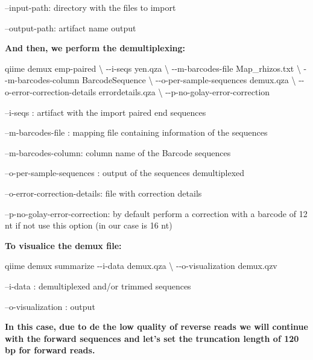 \documentclass[]{interact}
\theoremstyle{plain}%
\theoremstyle{definition}
\theoremstyle{remark}
\newenvironment{Shaded}{\begin{snugshade}}{\end{snugshade}}
\newcommand{\DataTypeTok}[1]{\textcolor[rgb]{0.13,0.29,0.53}{#1}}
\newcommand{\ExtensionTok}[1]{#1}
\newcommand{\NormalTok}[1]{#1}
\begin{document}
--input-path: directory with the files to import

--output-path: artifact name output

\textbf{And then, we perform the demultiplexing:}

\begin{Shaded}
\begin{Highlighting}[]
\ExtensionTok{qiime}\NormalTok{ demux emp{-}paired  }\DataTypeTok{\textbackslash{}}
\NormalTok{{-}{-}i{-}seqs yen.qza }\DataTypeTok{\textbackslash{}}
\NormalTok{{-}{-}m{-}barcodes{-}file Map\_rhizos.txt }\DataTypeTok{\textbackslash{}}
\NormalTok{{-}{-}m{-}barcodes{-}column BarcodeSequence }\DataTypeTok{\textbackslash{}}
\NormalTok{{-}{-}o{-}per{-}sample{-}sequences demux.qza }\DataTypeTok{\textbackslash{}}
\NormalTok{{-}{-}o{-}error{-}correction{-}details errordetails.qza }\DataTypeTok{\textbackslash{}}
\NormalTok{{-}{-}p{-}no{-}golay{-}error{-}correction }
\end{Highlighting}
\end{Shaded}

--i-seqs : artifact with the import paired end sequences

--m-barcodes-file : mapping file containing information of the sequences

--m-barcodes-column: column name of the Barcode sequences

--o-per-sample-sequences : output of the sequences demultiplexed

--o-error-correction-details: file with correction details

--p-no-golay-error-correction: by default perform a correction with a
barcode of 12 nt if not use this option (in our case is 16 nt)

\textbf{To visualice the demux file:}

\begin{Shaded}
\begin{Highlighting}[]
\ExtensionTok{qiime}\NormalTok{ demux summarize }
\ExtensionTok{{-}{-}i{-}data}\NormalTok{ demux.qza }\DataTypeTok{\textbackslash{} }
\ExtensionTok{{-}{-}o{-}visualization}\NormalTok{  demux.qzv}
\end{Highlighting}
\end{Shaded}

--i-data : demultiplexed and/or trimmed sequences

--o-visualization : output

\textbf{In this case, due to de the low quality of reverse reads we will
continue with the forward sequences and let's set the truncation length
of 120 bp for forward reads.}
\end{document}
